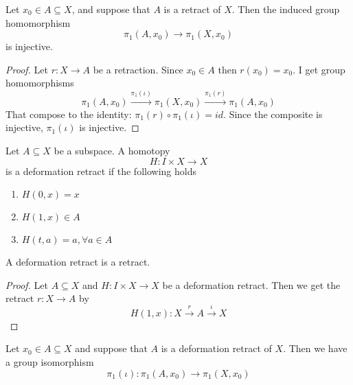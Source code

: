\begin{lemma}
  \label{lma:retract->inj}
  Let \( x_0 \in A \subseteq X  \), and suppose
  that \( A \) is a retract of \( X \).
  Then the induced group homomorphism
  \[
    \pi_1(A, x_0) \longrightarrow \pi_1(X, x_0)
  \]
  is injective.
\end{lemma}

\begin{proof}
   Let \( r: X \to A \) be a retraction.
    Since \( x_0 \in A \) then \( r(x_0) = x_0 \).
    I get group homomorphisms
    \begin{equation}
      \pi_1(A, x_0) \xrightarrow{\pi_1(\iota)} \pi_1(X, x_0)
      \xrightarrow{\pi_1(r)} \pi_1(A, x_0)
    \end{equation}
    That compose to the identity: \( \pi_1(r) \circ \pi_1(\iota) = id \).
    Since the composite is injective, \( \pi_1(\iota) \) is injective.
\end{proof}

\begin{definition}
    Let \( A \subseteq X \) be a subspace.
    A homotopy
    \[
      H: I \times X \to X
    \]
    is a deformation retract if the following holds
    \begin{enumerate}
      \item \( H(0, x) = x \)
      \item \( H(1, x) \in A \)
      \item \( H(t, a) = a, \forall a \in A \)
    \end{enumerate}
\end{definition}

\begin{remark}
   A deformation retract is a retract. 
\end{remark}

\begin{proof}
    Let \( A \subseteq X \) and \( H: I\times X \to X \)
    be a deformation retract. Then we get the retract
    \( r: X \to A \) by
    \[
      H(1, x): X \xrightarrow{r} A \xrightarrow{\iota} X
    \]

\end{proof}

\begin{theorem}
    Let \( x_0 \in A \subseteq X \) and suppose
    that \( A \) is a deformation retract of \( X \).
    Then we have a group isomorphism
    \[
      \pi_1(\iota): \pi_1(A, x_0) \to \pi_1(X, x_0)
    \]
\end{theorem}

